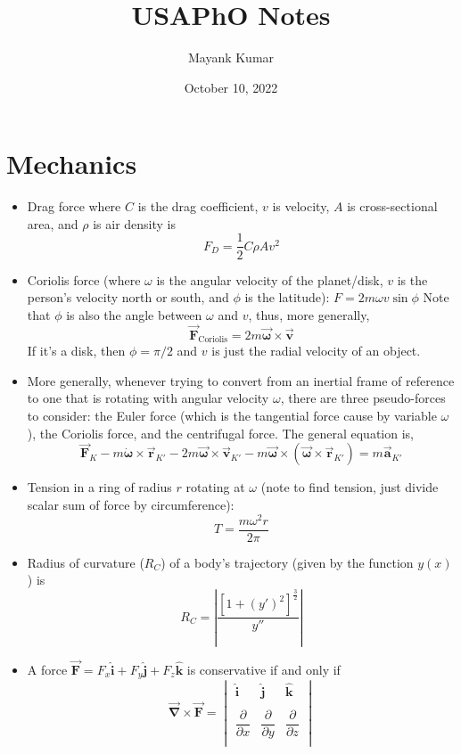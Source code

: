 \documentclass{scrartcl}
\title{USAPhO Notes}
\author{Mayank Kumar}
\date{October 10, 2022}
\begin{document}
    \maketitle
    \section{Mechanics}
    \begin{itemize}
        \item Drag force where $C$ is the drag coefficient, $v$ is velocity, $A$ is cross-sectional area, and $\rho$ is air density is \[F_D=\frac 12C\rho Av^2\]
        \item Coriolis force (where $\omega$ is the angular velocity of the planet/disk, $v$ is the person's velocity north or south, and $\phi$ is the latitude): $\boxed{F=2m\omega v\sin\phi}$ Note that $\phi$ is also the angle between $\omega$ and $v$, thus, more generally, \[\vec{\mathbf F}_\text{Coriolis}=2m\vec{\mathbf \omega}\times\vec{\mathbf v}\] If it's a disk, then $\phi=\pi/2$ and $v$ is just the radial velocity of an object.
        \item More generally, whenever trying to convert from an inertial frame of reference to one that is rotating with angular velocity $\omega$, there are three pseudo-forces to consider: the Euler force (which is the tangential force cause by variable $\omega$), the Coriolis force, and the centrifugal force. The general equation is, \[\vec{\mathbf F}_K-m\dot{\mathbf{\omega}}\times\vec{\mathbf r}_{K'}-2m\vec{\mathbf \omega}\times\vec{\mathbf v}_{K'}-m\vec{\mathbf \omega}\times\left(\vec{\mathbf \omega}\times\vec{\mathbf r}_{K'}\right)=m\vec{\mathbf a}_{K'}\]
        \item Tension in a ring of radius $r$ rotating at $\omega$ (note to find tension, just divide scalar sum of force by circumference): \[T=\frac{m\omega^2 r}{2\pi}\]
        \item Radius of curvature ($R_C$) of a body's trajectory (given by the function $y(x)$) is \[R_C=\left|\frac{\left[1+\left(y'\right)^2\right]^{\frac32}}{y''}\right|\]
        \item A force $\vec{\mathbf F}=F_x\mathbf{\hat i}+F_y\mathbf{\hat j}+F_z\mathbf{\hat k}$  is conservative if and only if
        \[\vec{\mathbf \nabla}\times\vec{\mathbf F}=\begin{vmatrix}
            \mathbf{\hat i} & \mathbf{\hat j} & \mathbf{\hat k} \\
            \\\dfrac{\partial}{\partial x} & \dfrac{\partial}{\partial y} & \dfrac{\partial}{\partial z}\\

\end{vmatrix}\]
\end{itemize}
\end{document}
